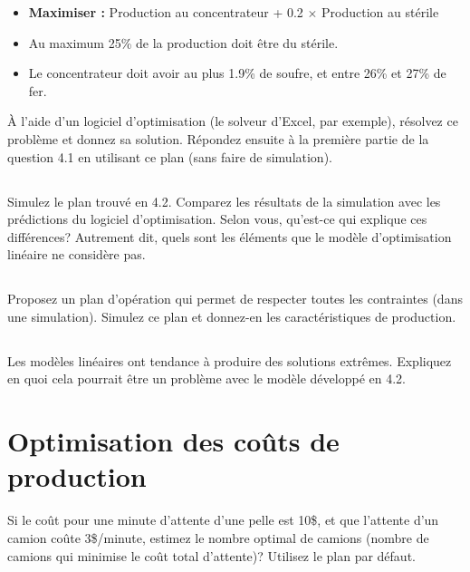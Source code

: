 \documentclass[letterpaper,12pt]{article}
\begin{document}
	\begin{itemize}
		\item \textbf{Maximiser : }  Production au concentrateur + 0.2 $\times$ Production au stérile
		\item Au maximum 25\% de la production doit être du stérile.
		\item Le concentrateur doit avoir au plus 1.9\% de soufre, et entre 26\% et 27\% de fer.
	\end{itemize}
	
	À l'aide d'un logiciel d'optimisation (le solveur d'Excel, par exemple), résolvez ce problème et donnez sa solution. Répondez ensuite à la première partie de la question 4.1 en utilisant ce plan (sans faire de simulation).
	
	\subsection{}
	
	Simulez le plan trouvé en 4.2. Comparez les résultats de la simulation avec les prédictions du logiciel d'optimisation. Selon vous, qu'est-ce qui explique ces différences? Autrement dit, quels sont les éléments que le modèle d'optimisation linéaire ne considère pas.
	
	\subsection{}
	
	Proposez un plan d'opération qui permet de respecter toutes les contraintes (dans une simulation). Simulez ce plan et donnez-en les caractéristiques de production.
	
	\subsection{}
	Les modèles linéaires ont tendance à produire des solutions extrêmes. Expliquez en quoi cela pourrait être un problème avec le modèle développé en 4.2.
	
	
	
	
	
	
	\section{Optimisation des coûts de production}
	
	Si le coût pour une minute d’attente d’une pelle est 10\$, et que l’attente d’un camion coûte 3\$/minute, estimez le nombre optimal de camions (nombre de camions qui minimise le coût total d'attente)? Utilisez le plan par défaut.
	
\end{document}

